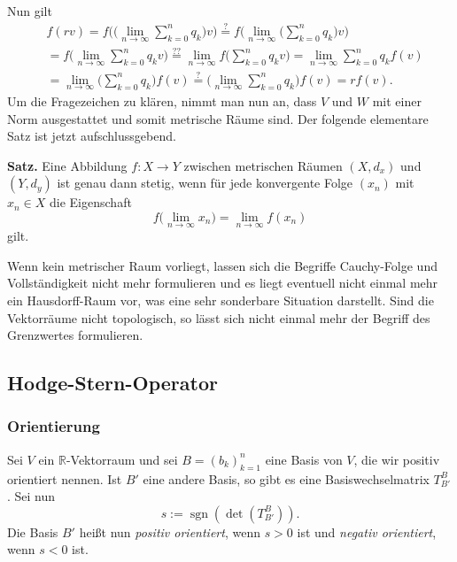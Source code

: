 \documentclass[a4paper,10pt,fleqn,twocolumn,twoside,dvipdfmx]{scrartcl}
\numberwithin{equation}{section}
\newcommand{\R}{\mathbb R}
\DeclareMathOperator{\sgn}{sgn}
\theoremstyle{rmbox}
\begin{document}
Nun gilt
\begin{equation}
\begin{split}
&f(rv) = f\bigg(\bigg(\lim_{n\to\infty}\sum_{k=0}^n q_k\bigg)v\bigg)
\stackrel{?}= f\bigg(\lim_{n\to\infty}\bigg(\sum_{k=0}^n q_k\bigg)v\bigg)\\
&= f\bigg(\lim_{n\to\infty}\sum_{k=0}^n q_k v\bigg)
\stackrel{??}= \lim_{n\to\infty} f\bigg(\sum_{k=0}^n q_k v\bigg)
= \lim_{n\to\infty}\sum_{k=0}^n q_k f(v)\\
&= \lim_{n\to\infty}\bigg(\sum_{k=0}^n q_k\bigg) f(v)
\stackrel{?}= \bigg(\lim_{n\to\infty}\sum_{k=0}^n q_k\bigg) f(v)
= r f(v).
\end{split}
\end{equation}
Um die Fragezeichen zu klären, nimmt man nun an, dass $V$ und $W$
mit einer Norm ausgestattet und somit metrische Räume sind.
Der folgende elementare Satz ist jetzt aufschlussgebend.

\textbf{Satz.} Eine Abbildung $f\colon X\to Y$ zwischen metrischen
Räumen $(X,d_x)$ und $(Y,d_y)$ ist genau dann stetig, wenn für
jede konvergente Folge $(x_n)$ mit $x_n\in X$ die Eigenschaft
\begin{equation}
f\Big(\lim_{n\to\infty} x_n\Big) = \lim_{n\to\infty} f(x_n)
\end{equation}
gilt.

Wenn kein metrischer Raum vorliegt, lassen sich die Begriffe
Cauchy-Folge und Vollständigkeit nicht mehr formulieren und es
liegt eventuell nicht einmal mehr ein Hausdorff-Raum vor, was eine
sehr sonderbare Situation darstellt. Sind die Vektorräume nicht
topologisch, so lässt sich nicht einmal mehr der Begriff des
Grenzwertes formulieren.

\subsection{Hodge-Stern-Operator}
\subsubsection{Orientierung}
Sei $V$ ein $\R$-Vektorraum und sei $B=(b_k)_{k=1}^n$ eine Basis
von $V$, die wir positiv orientiert nennen. Ist $B'$ eine andere
Basis, so gibt es eine Basiswechselmatrix $T_{B'}^B$. Sei nun
\begin{equation}
s := \sgn(\det(T_{B'}^B)).
\end{equation}
Die Basis $B'$ heißt nun \emph{positiv orientiert}, wenn
$s>0$ ist und \emph{negativ orientiert}, wenn $s<0$ ist.
\end{document}
